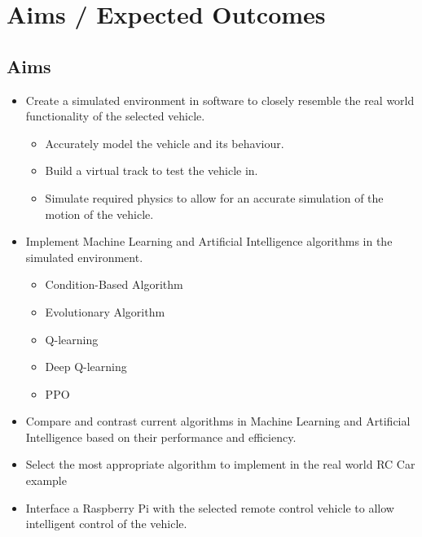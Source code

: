 \documentclass[8pt]{article}
\begin{document}
\newpage

%
%
%


\section{Aims / Expected Outcomes}

\subsection{Aims}
\begin{itemize}
	\item Create a simulated environment in software to closely resemble the real world functionality of the selected vehicle.
	\begin{itemize}
		\item Accurately model the vehicle and its behaviour.
		\item Build a virtual track to test the vehicle in.
		\item Simulate required physics to allow for an accurate simulation of the motion of the vehicle.
	\end{itemize}

	\item Implement Machine Learning and Artificial Intelligence algorithms in the simulated environment.
	\begin{itemize}
		\item Condition-Based Algorithm
		\item Evolutionary Algorithm
		\item Q-learning
		\item Deep Q-learning
		\item PPO
	\end{itemize}

	\item Compare and contrast current algorithms in Machine Learning and Artificial Intelligence based on their performance and efficiency.

	\item Select the most appropriate algorithm to implement in the real world RC Car example

	\item Interface a Raspberry Pi with the selected remote control vehicle to allow intelligent control of the vehicle.


\end{itemize}
\end{document}
